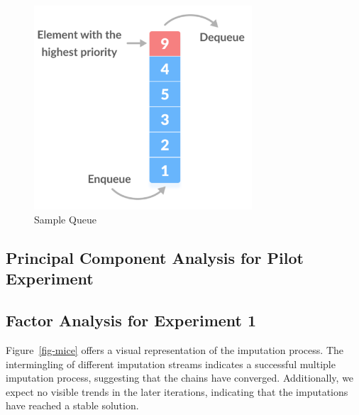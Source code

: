 \documentclass[
]{article}
\begin{document}
\begin{figure}

{\centering \includegraphics[width=3.2in,height=\textheight]{images/prioq-illustration.png}

}

\caption{Sample Queue}

\end{figure}

\newpage{}

\hypertarget{principal-component-analysis-for-pilot-experiment}{%
\subsection{Principal Component Analysis for Pilot
Experiment}\label{principal-component-analysis-for-pilot-experiment}}

\newpage{}

\hypertarget{factor-analysis-for-experiment-1}{%
\subsection{Factor Analysis for Experiment
1}\label{factor-analysis-for-experiment-1}}

Figure~\ref{fig-mice} offers a visual representation of the imputation
process. The intermingling of different imputation streams indicates a
successful multiple imputation process, suggesting that the chains have
converged. Additionally, we expect no visible trends in the later
iterations, indicating that the imputations have reached a stable
solution.
\end{document}

